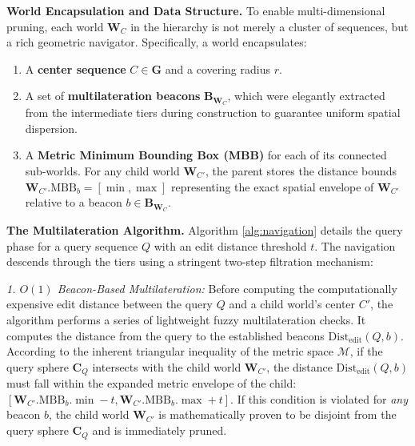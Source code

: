 \documentclass[10pt,runningheads]{llncs}
\begin{document}
\textbf{World Encapsulation and Data Structure.}
To enable multi-dimensional pruning, each world $\textbf{W}_C$ in the hierarchy is not merely a cluster of sequences, but a rich geometric navigator. Specifically, a world encapsulates:
\begin{enumerate}
    \item A \textbf{center sequence} $C \in \textbf{G}$ and a covering radius $r$.
    \item A set of \textbf{multilateration beacons} $\textbf{B}_{\textbf{W}_C}$, which were elegantly extracted from the intermediate tiers during construction to guarantee uniform spatial dispersion.
    \item A \textbf{Metric Minimum Bounding Box (MBB)} for each of its connected sub-worlds. For any child world $\textbf{W}_{C'}$, the parent stores the distance bounds $\textbf{W}_{C'}.\text{MBB}_b = [\min, \max]$ representing the exact spatial envelope of $\textbf{W}_{C'}$ relative to a beacon $b \in \textbf{B}_{\textbf{W}_C}$.
\end{enumerate}

\textbf{The Multilateration Algorithm.}
Algorithm \ref{alg:navigation} details the query phase for a query sequence $Q$ with an edit distance threshold $t$. The navigation descends through the tiers using a stringent two-step filtration mechanism:

\textit{1. $O(1)$ Beacon-Based Multilateration:} Before computing the computationally expensive edit distance between the query $Q$ and a child world's center $C'$, the algorithm performs a series of lightweight fuzzy multilateration checks. It computes the distance from the query to the established beacons $\mathrm{Dist}_{\mathrm{edit}}(Q, b)$. According to the inherent triangular inequality of the metric space $\mathcal{M}$, if the query sphere $\textbf{C}_Q$ intersects with the child world $\textbf{W}_{C'}$, the distance $\mathrm{Dist}_{\mathrm{edit}}(Q, b)$ must fall within the expanded metric envelope of the child: $[\textbf{W}_{C'}.\text{MBB}_b.\min - t, \textbf{W}_{C'}.\text{MBB}_b.\max + t]$. If this condition is violated for \textit{any} beacon $b$, the child world $\textbf{W}_{C'}$ is mathematically proven to be disjoint from the query sphere $\textbf{C}_Q$ and is immediately pruned.
\end{document}
